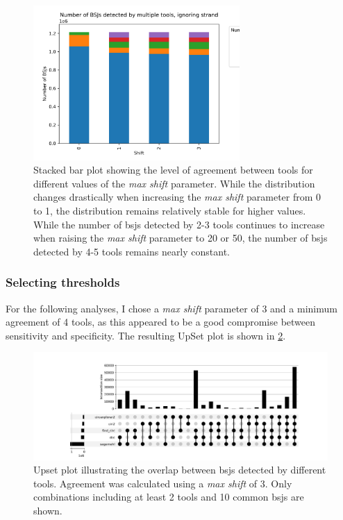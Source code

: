 \begin{figure}[H]
    \centering

    \includegraphics[width=0.7\textwidth]{chapters/4_results_and_discussion/figures/detection/shift_agreement_unstranded.png}
    \caption{Stacked bar plot showing the level of agreement between tools for
        different values of the \textit{max shift} parameter.
        While the distribution changes drastically when increasing the \textit{max
            shift} parameter from 0 to 1, the distribution remains relatively stable for
        higher values.
        While the number of \glspl{bsj} detected by 2-3 tools continues to increase
        when raising the \textit{max shift} parameter to 20 or 50, the number of
        \glspl{bsj} detected by 4-5 tools remains nearly constant.
    }
    \label{fig:shift_agreement_unstranded}
\end{figure}

\subsubsection{Selecting thresholds}

For the following analyses, I chose a \textit{max shift} parameter of 3 and a
minimum agreement of 4 tools, as this appeared to be a good compromise between
sensitivity and specificity.
The resulting UpSet plot is shown in \cref{fig:detection_upset_3}.

\begin{figure}[H]
    \centering

    \includegraphics[width=\textwidth]{chapters/4_results_and_discussion/figures/detection/upset/shift_3_unstranded.png}
    \caption{Upset plot illustrating the overlap between \glspl{bsj} detected
        by
        different tools.
        Agreement was calculated using a \textit{max shift} of 3.
        Only combinations including at least 2 tools and 10 common \glspl{bsj} are
        shown.
    }
    \label{fig:detection_upset_3}
\end{figure}

